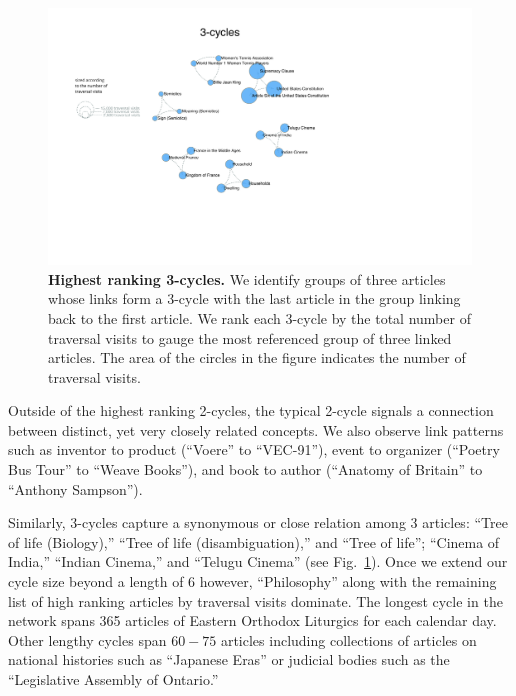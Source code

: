 \documentclass[pre,twocolumn,twoside,superscriptaddress,floatfix, aps, 10pt]{revtex4-1}
\begin{document}
\begin{figure}[tp!]
  \includegraphics[width=\textwidth]{graphics/3_cycles.pdf}
  \caption{
\textbf{Highest ranking 3-cycles.}
We identify groups of three articles whose links form a 3-cycle with the 
last article in the group linking back to the first article.
We rank each 3-cycle by the total number of traversal visits to gauge
the most referenced group of three linked articles. 
The area of the circles in the figure indicates the number of traversal visits.}
  \label{fig:3-cycles}
\end{figure}

Outside of the highest ranking 2-cycles, the typical 2-cycle signals a connection between distinct, yet very closely related concepts. 
We also observe link patterns such as inventor to product (``Voere'' to ``VEC-91''), event to organizer (``Poetry Bus Tour'' to ``Weave Books''), and book to author (``Anatomy of Britain'' to ``Anthony Sampson'').

Similarly, 3-cycles capture a synonymous or close relation among 3 articles: ``Tree of life (Biology),'' ``Tree of life (disambiguation),'' 
and ``Tree of life''; ``Cinema of India,'' ``Indian Cinema,'' and ``Telugu Cinema''
(see Fig.~\ref{fig:3-cycles}).
Once we extend our cycle size beyond a length of 6 however, 
``Philosophy'' along with the remaining list of high ranking articles by traversal visits dominate.
The longest cycle in the network spans 365 articles of Eastern Orthodox Liturgics for each calendar day.
Other lengthy cycles span $60-75$ articles including collections of articles on national histories such as ``Japanese Eras'' 
or judicial bodies such as the ``Legislative Assembly of Ontario.''
\end{document}
